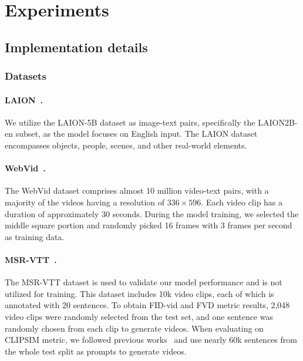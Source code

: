 \section{Experiments}

\subsection{Implementation details}

\subsubsection{Datasets}

\paragraph{LAION~\cite{schuhmann2021laion}.} We utilize the LAION-5B dataset as image-text pairs, specifically the LAION2B-en subset, as the model focuses on English input. The LAION dataset encompasses objects, people, scenes, and other real-world elements. 

\paragraph{WebVid~\cite{Bain21}.} The WebVid dataset comprises almost 10 million video-text pairs, with a majority of the videos having a resolution of $336 \times 596$. Each video clip has a duration of approximately 30 seconds. During the model training, we selected the middle square portion and randomly picked 16 frames with 3 frames per second as training data.

\paragraph{MSR-VTT~\cite{xu2016msr-vtt}.} The MSR-VTT dataset is used to validate our model performance and is not utilized for training. This dataset includes 10k video clips, each of which is annotated with 20 sentences. To obtain FID-vid and FVD metric results, 2,048 video clips were randomly selected from the test set, and one sentence was randomly chosen from each clip to generate videos. When evaluating on CLIPSIM metric, we followed previous works~\cite{singer2022make-a-video,wu2022nuwa} and use nearly 60k sentences from the whole test split as prompts to generate videos.

